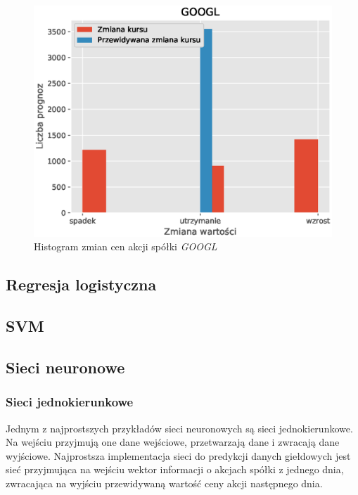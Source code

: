 \documentclass[a4paper, twoside, 11pt, openright]{article}
\begin{document}
\begin{figure}[H]
\centering \includegraphics[scale=0.9]{img/linear_regression/l_r_discrete_score}
\caption{Histogram zmian cen akcji spółki \textit{GOOGL}}
\label{l_r_discrete_score}
\end{figure}

\subsection{Regresja logistyczna}

\subsection{SVM}

\subsection{Sieci neuronowe}

\subsubsection{Sieci jednokierunkowe}

Jednym z najprostszych przykładów sieci neuronowych są sieci jednokierunkowe. Na wejściu przyjmują one dane wejściowe, przetwarzają dane i zwracają dane wyjściowe. Najprostsza implementacja sieci do predykcji danych giełdowych jest sieć przyjmująca na wejściu wektor informacji o akcjach spółki z jednego dnia, zwracająca na wyjściu przewidywaną wartość ceny akcji następnego dnia.
\end{document}
